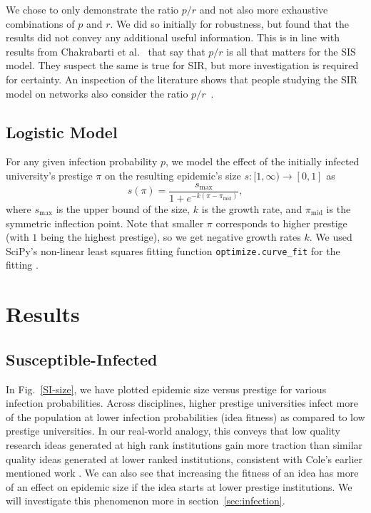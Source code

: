 \documentclass[%
 reprint,
 amsmath,amssymb,
 aps,
]{revtex4-1}
\begin{document}
We chose to only demonstrate the ratio $p/r$ and not also more exhaustive combinations of $p$ and $r$. We did so initially for robustness, but found that the results did not convey any additional useful information. This is in line with results from Chakrabarti et al.~\cite{chakrabarti:epidemicsonrealnetworks} that say that $p/r$ is all that matters for the SIS model. They suspect the same is true for SIR, but more investigation is required for certainty. An inspection of the literature shows that people studying the SIR model on networks also consider the ratio $p/r$~\cite{fournet:2016,jones:reproduction}. \\

\subsection{\label{sec:logistic}Logistic Model}

For any given infection probability $p$, we model the effect of the initially infected university's prestige $\pi$ on the resulting epidemic's size $s : [1, \infty) \to [0, 1]$ as
\[
  s(\pi) = \frac{s_\text{max}}{1 + e^{-k (\pi - \pi_\text{mid})}},
\]
where $s_\text{max}$ is the upper bound of the size, $k$ is the growth rate, and $\pi_\text{mid}$ is the symmetric inflection point. Note that smaller $\pi$ corresponds to higher prestige (with $1$ being the highest prestige), so we get negative growth rates $k$. We used SciPy's non-linear least squares fitting function \texttt{optimize.curve\_fit} for the fitting \cite{scipy}.


\section{\label{sec:level1}Results}
\subsection{\label{sec:level2}Susceptible-Infected}


In Fig.~\ref{SI-size}, we have plotted epidemic size versus prestige for various infection probabilities. Across disciplines, higher prestige universities infect more of the population at lower infection probabilities (idea fitness) as compared to low prestige universities. In our real-world analogy, this conveys that low quality research ideas generated at high rank institutions gain more traction than similar quality ideas generated at lower ranked institutions, consistent with Cole's earlier mentioned work \cite{cole:citation-prestige}. We can also see that increasing the fitness of an idea has more of an effect on epidemic size if the idea starts at lower prestige institutions. We will investigate this phenomenon more in section~\ref{sec:infection}.
\end{document}
